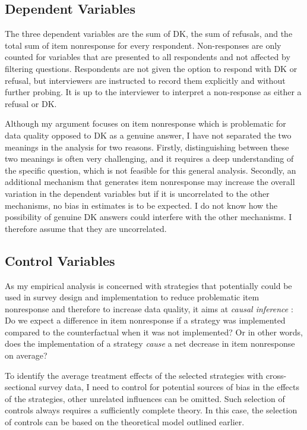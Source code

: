 \documentclass[a4paper,12pt]{article}
\begin{document}
\subsection{Dependent Variables}

The three dependent variables are the sum of DK, the sum of refusals, and the total sum of item nonresponse for every respondent. Non-responses are only counted for variables that are presented to all respondents and not affected by filtering questions. Respondents are not given the option to respond with DK or refusal, but interviewers are instructed to record them explicitly and without further probing. It is up to the interviewer to interpret a non-response as either a refusal or DK.

Although my argument focuses on item nonresponse which is problematic for data quality opposed to DK as a genuine answer, I have not separated the two meanings in the analysis for two reasons. Firstly, distinguishing between these two meanings is often very challenging, and it requires a deep understanding of the specific question, which is not feasible for this general analysis. Secondly, an additional mechanism that generates item nonresponse may increase the overall variation in the dependent variables but if it is uncorrelated to the other mechanisms, no bias in estimates is to be expected. I do not know how the possibility of genuine DK answers could interfere with the other mechanisms. I therefore assume that they are uncorrelated.


\subsection{Control Variables}

As my empirical analysis is concerned with strategies that potentially could be used in survey design and implementation to reduce problematic item nonresponse and therefore to increase data quality, it aims at \textit{causal inference} \citep{angristMostlyHarmlessEconometrics2009}: Do we expect a difference in item nonresponse if a strategy was implemented compared to the counterfactual when it was not implemented? Or in other words, does the implementation of a strategy \textit{cause} a net decrease in item nonresponse on average?

To identify the average treatment effects of the selected strategies with cross-sectional survey data, I need to control for potential sources of bias in the effects of the strategies, other unrelated influences can be omitted. Such selection of controls always requires a sufficiently complete theory. In this case, the selection of controls can be based on the theoretical model outlined earlier.
\end{document}
